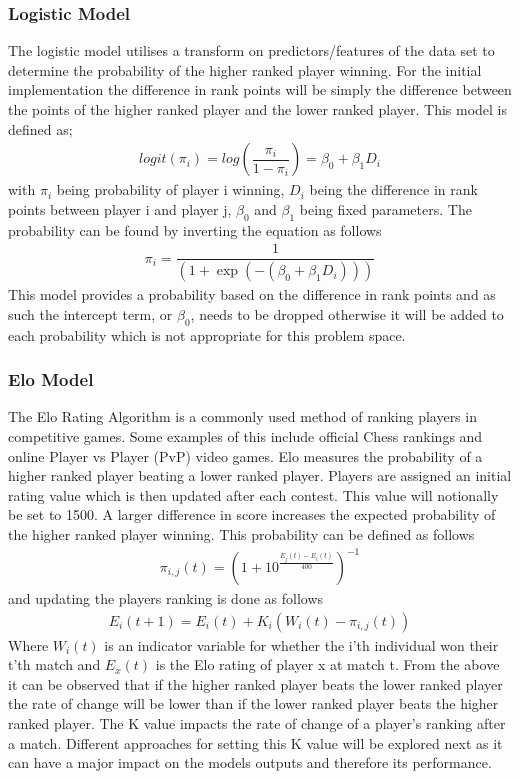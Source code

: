 \documentclass[12pt,a4paper]{article}
\begin{document}
\subsubsection{Logistic Model}
The logistic model utilises a transform on predictors/features of the data set to
determine the probability of the higher ranked player winning. For the initial
implementation the difference in rank points will be simply the difference
between the points of the higher ranked player and the lower ranked player. This
model is defined as;
\begin{gather}
  logit(\pi_i) = log(\dfrac{\pi_i}{1-\pi_i}) = \beta_0 + \beta_1 D_i
\end{gather}
with $\pi_i$ being probability of player i winning,
$D_i$ being the difference in rank points between player i and player j, $\beta_0$
and $\beta_1$ being fixed parameters. The probability can be found by inverting
the equation as follows
\begin{gather}
  \pi_i = \dfrac{1}{(1+\exp(-(\beta_0 + \beta_1 D_i)))}
\end{gather}
This model provides a probability based on the difference in rank points and as such the
intercept term, or $\beta_0$, needs to be dropped otherwise it will be added to each
probability which is not appropriate for this problem space.
\subsubsection{Elo Model}
The Elo Rating Algorithm is a commonly used method of ranking players in competitive
games. Some examples of this include official Chess rankings and online Player vs Player (PvP)
video games. Elo measures the probability of a higher ranked player beating a
lower ranked player. Players are assigned an initial rating value which is then updated after each contest.
This value will notionally be set to 1500. A larger difference in score increases the expected probability
of the higher ranked player winning. This probability can be defined as follows
\begin{gather}
  \pi_{i,j}(t) = (1 + 10^{\tfrac{E_j(t)-E_i(t)}{400}})^{-1}
\end{gather}
and updating the players ranking is done as follows
\begin{gather}
  E_i(t+1) = E_i(t) +K_i(W_i(t)-\pi_{i,j}(t))
\end{gather}
Where $W_i(t)$ is an indicator variable for whether the i'th individual won their
t'th match and $E_x(t)$ is the Elo rating of player x at match t.
From the above it can be observed that if the higher ranked player
beats the lower ranked player the rate of change will be lower than if the lower
ranked player beats the higher ranked player.
The K value impacts the rate of change of a player's ranking after a match. Different
approaches for setting this K value will be explored next as it can have a major
impact on the models outputs and therefore its performance.
\end{document}

